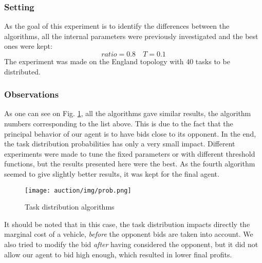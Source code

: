 \documentclass[11pt]{article}
\begin{document}
\subsubsection{Setting}
As the goal of this experiment is to identify the differences between the algorithms, all the internal parameters were previously investigated and the best ones were kept: $$ratio = 0.8 \quad T = 0.1$$
The experiment was made on the England topology with 40 tasks to be distributed.

\subsubsection{Observations}

As one can see on Fig. \ref{fig:prob}, all the algorithms gave similar results, the algorithm numbers corresponding to the list above. This is due to the fact that the principal behavior of our agent is to have bids close to its opponent. In the end, the task distribution probabilities has only a very small impact. Different experiments were made to tune the fixed parameters or with different threshold functions, but the results presented here were the best. As the fourth algorithm seemed to give slightly better results, it was kept for the final agent.

\begin{figure}[H]
    \centering
    \texttt{[image: auction/img/prob.png]}
    \caption{Task distribution algorithms}
    \label{fig:prob}
\end{figure}

It should be noted that in this case, the task distribution impacts directly the marginal cost of a vehicle, \textit{before} the opponent bids are taken into account. We also tried to modify the bid \textit{after} having considered the opponent, but it did not allow our agent to bid high enough, which resulted in lower final profits.
\end{document}
